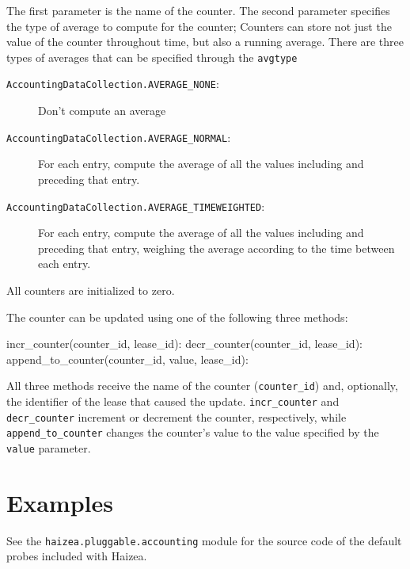 The first parameter is the name of the counter. The second parameter specifies the type of average to compute for the counter; Counters can store not just the value of the counter throughout time, but also a running average. There are three types of averages that can be specified through the \texttt{avgtype}
        
\begin{description}
\item[\texttt{AccountingDataCollection.AVERAGE\_NONE}:] Don't compute an average
\item[\texttt{AccountingDataCollection.AVERAGE\_NORMAL}:] For each entry, compute the average of all the values including and preceding that entry.
\item[\texttt{AccountingDataCollection.AVERAGE\_TIMEWEIGHTED}:]  For each entry, compute the average of all the values including and preceding that entry, weighing the average according to the time between each entry.
\end{description}

All counters are initialized to zero.

The counter can be updated using one of the following three methods:

\begin{wideshellverbatim}
incr_counter(counter_id, lease_id):
decr_counter(counter_id, lease_id):
append_to_counter(counter_id, value, lease_id):
\end{wideshellverbatim}

All three methods receive the name of the counter (\verb+counter_id+) and, optionally, the identifier of the lease that caused the update. \verb+incr_counter+ and \verb+decr_counter+ increment or decrement the counter, respectively, while \verb+append_to_counter+ changes the counter's value to the value specified by the \verb+value+ parameter.


\section{Examples}

See the \texttt{haizea.pluggable.accounting} module for the source code of the default probes included with Haizea.